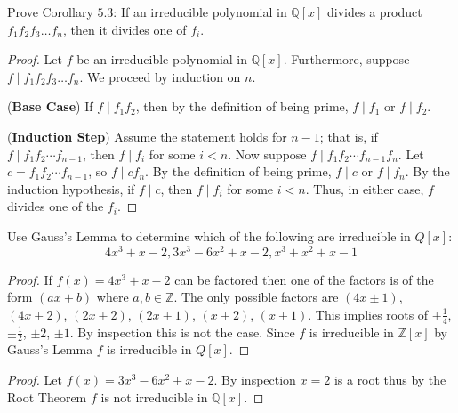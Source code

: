 \begin{tcolorbox}[title=Problem 3, breakable]
    Prove Corollary $5.3$: If an irreducible polynomial
    in $\mathbb{Q}[x]$ divides a product $f_1 f_2 f_3 \ldots f_n$,
    then it divides one of $f_i$.
\end{tcolorbox}

\begin{proof}
    Let $f$ be an irreducible polynomial in $\mathbb{Q}[x]$.
    Furthermore, suppose $f \mid f_1 f_2 f_3 \ldots f_n$.
    We proceed by induction on $n$.

    (\textbf{Base Case})  
    If $f \mid f_1 f_2$, then by the definition of being prime, 
    $f \mid f_1$ or $f \mid f_2$.

    (\textbf{Induction Step})  
    Assume the statement holds for $n - 1$; that is, 
    if $f \mid f_1 f_2 \cdots f_{n-1}$, then $f \mid f_i$ for some $i < n$.  
    Now suppose $f \mid f_1 f_2 \cdots f_{n-1} f_n$.  
    Let $c = f_1 f_2 \cdots f_{n-1}$, so $f \mid c f_n$.  
    By the definition of being prime, $f \mid c$ or $f \mid f_n$.  
    By the induction hypothesis, if $f \mid c$, then $f \mid f_i$ for some $i < n$.  
    Thus, in either case, $f$ divides one of the $f_i$.
\end{proof}

\newpage
\begin{tcolorbox}[title=Problem 4, breakable]
    Use Gauss's Lemma to determine which of the following 
    are irreducible in $Q[x]$:
    \[4x^3 + x - 2, 3x^3 - 6x^2 + x - 2, x^3 + x^2 + x - 1\]
\end{tcolorbox}

\begin{proof}
    If $f(x) = 4x^3 + x - 2$ can be factored then one of 
        the factors is of the form $(ax + b)$
        where $a, b \in \mathbb{Z}$.
    The only possible factors are 
        $(4x \pm 1)$, $(4x \pm 2)$, $(2x \pm 2)$, $(2x \pm 1)$, $(x \pm 2)$, $(x \pm 1)$.
    This implies roots of $\pm \frac{1}{4}$, $\pm \frac{1}{2}$, $\pm 2$, $\pm 1$.
    By inspection this is not the case.
    Since $f$ is irreducible in $\mathbb{Z}[x]$ by Gauss's Lemma $f$ is irreducible in $Q[x]$.
\end{proof}

\begin{proof}
    Let $f(x) =  3x^3 - 6x^2 + x - 2$.
    By inspection $x = 2$ is a root thus by the Root Theorem 
        $f$ is not irreducible in $\mathbb{Q}[x]$.
\end{proof}


